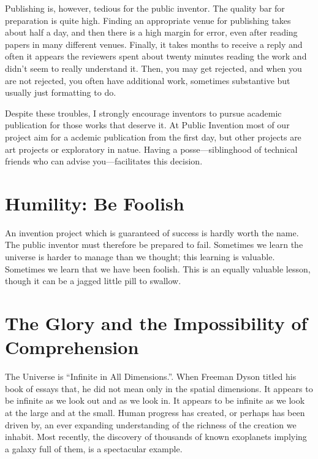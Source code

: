 \documentclass[
	fontsize=10pt, %
	twoside=false, %
	secnumdepth=1, %
]{kaobook}
\begin{document}
Publishing is, however, tedious for the public inventor.
The quality bar for preparation is quite high.
Finding an appropriate venue for publishing takes about half a day, and
then there is a high margin for error, even after reading papers in many
different venues.
Finally, it takes months to receive a reply and often it appears
the reviewers spent about twenty minutes reading the work and didn't seem
to really understand it.
Then, you may get rejected, and when you are not rejected, you often
have additional work, sometimes substantive but usually just formatting to do.

Despite these troubles, I strongly encourage inventors to pursue
academic publication for those works that deserve it. At Public Invention
most of our project aim for a acdemic publication from the first day,
but other projects are art projects or exploratory in natue.
Having a posse---siblinghood of technical friends who can advise you---facilitates this decision.

\section{Humility: Be Foolish}

An invention project which is guaranteed of success is hardly worth the name.
The public inventor must therefore be prepared to fail.
Sometimes we learn the universe is harder to manage than we thought;
this learning is valuable.
Sometimes we learn that we have been foolish.
This is an equally valuable lesson, though it can be a jagged little pill
to swallow.

\section{The Glory and the Impossibility of Comprehension}

The Universe is ``Infinite in All Dimensions.''\cite{Dyson1989}.
When Freeman Dyson titled his book of essays that, he did not mean
only in the spatial dimensions.
It appears to be infinite as we look out and as we look in.
It appears to be infinite as we look at the large and at the small.
Human progress has created, or perhaps has been driven by,
an ever expanding understanding of the richness of the creation
we inhabit. Most recently, the discovery of thousands of known
exoplanets implying a galaxy full of them, is a spectacular example.
\end{document}
